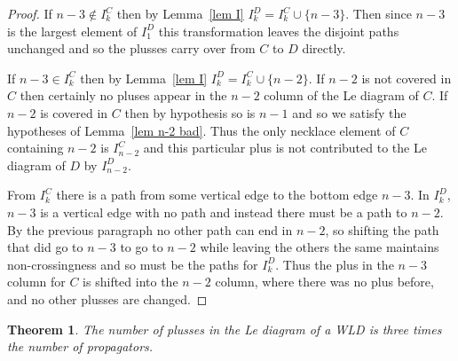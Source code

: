 \documentclass[11pt]{article}
\newtheorem{thm}{Theorem}[section]
\theoremstyle{remark}
\theoremstyle{definition}
\begin{document}
\begin{proof}
  If $n-3\not\in I_{k}^{C}$ then by Lemma~\ref{lem I} $I_{k}^{D} = I_k^{C}\cup \{n-3\}$.  Then since $n-3$ is the largest element of $I_1^{D}$ this transformation leaves the disjoint paths unchanged and so the plusses carry over from $C$ to $D$ directly.

  If $n-3\in I_{k}^{C}$ then by Lemma~\ref{lem I} $I_{k}^{D} = I_k^{C}\cup \{n-2\}$.  If $n-2$ is not covered in $C$ then certainly no pluses appear in the $n-2$ column of the Le diagram of $C$.  If $n-2$ is covered in $C$ then by hypothesis so is $n-1$ and so we satisfy the hypotheses of Lemma~\ref{lem n-2 bad}.  Thus the only necklace element of $C$ containing $n-2$ is $I_{n-2}^{C}$ and this particular plus is not contributed to the Le diagram of $D$ by $I_{n-2}^{D}$.

  {}From $I_{k}^{C}$ there is a path from some vertical edge to the bottom edge $n-3$.  In $I_{k}^{D}$, $n-3$ is a vertical edge with no path and instead there must be a path to $n-2$.  By the previous paragraph no other path can end in $n-2$, so shifting the path that did go to $n-3$ to go to $n-2$ while leaving the others the same maintains non-crossingness and so must be the paths for $I_{k}^{D}$.  Thus the plus in the $n-3$ column for $C$ is shifted into the $n-2$ column, where there was no plus before, and no other plusses are changed.
\end{proof}

\begin{thm}
  The number of plusses in the Le diagram of a WLD is three times the number of propagators.
\end{thm}
\end{document}
